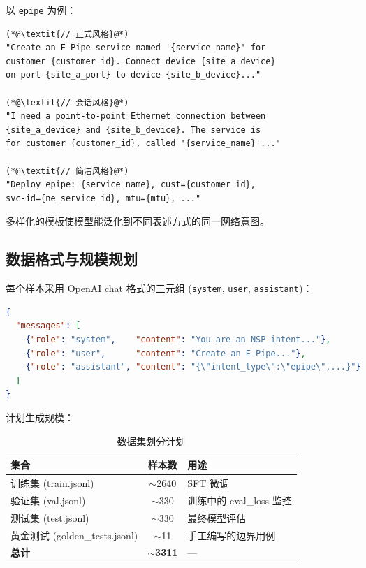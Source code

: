 \documentclass[12pt, a4paper]{article}
\newcommand{\intenttype}[1]{\texttt{#1}}
\begin{document}
\noindent
以 \intenttype{epipe} 为例：

\begin{lstlisting}[language={}, caption={epipe 指令模板示例（三种风格）}, numbers=none]
(*@\textit{// 正式风格}@*)
"Create an E-Pipe service named '{service_name}' for
customer {customer_id}. Connect device {site_a_device}
on port {site_a_port} to device {site_b_device}..."

(*@\textit{// 会话风格}@*)
"I need a point-to-point Ethernet connection between
{site_a_device} and {site_b_device}. The service is
for customer {customer_id}, called '{service_name}'..."

(*@\textit{// 简洁风格}@*)
"Deploy epipe: {service_name}, cust={customer_id},
svc-id={ne_service_id}, mtu={mtu}, ..."
\end{lstlisting}

\noindent
多样化的模板使模型能泛化到不同表述方式的同一网络意图。

\subsection{数据格式与规模规划}

每个样本采用 OpenAI chat 格式的三元组 (\texttt{system}, \texttt{user}, \texttt{assistant})：

\begin{lstlisting}[language=json, caption={训练样本格式示例}]
{
  "messages": [
    {"role": "system",    "content": "You are an NSP intent..."},
    {"role": "user",      "content": "Create an E-Pipe..."},
    {"role": "assistant", "content": "{\"intent_type\":\"epipe\",...}"}
  ]
}
\end{lstlisting}

\noindent
计划生成规模：

\begin{table}[H]
\centering
\caption{数据集划分计划}
\label{tab:data-split}
\small
\begin{tabular}{lcl}
\toprule
\textbf{集合} & \textbf{样本数} & \textbf{用途} \\
\midrule
训练集 (train.jsonl) & $\sim$2640 & SFT 微调 \\
验证集 (val.jsonl)   & $\sim$330  & 训练中的 eval\_loss 监控 \\
测试集 (test.jsonl)  & $\sim$330  & 最终模型评估 \\
黄金测试 (golden\_tests.jsonl) & $\sim$11 & 手工编写的边界用例 \\
\midrule
\textbf{总计} & $\sim$\textbf{3311} & --- \\
\bottomrule
\end{tabular}
\end{table}
\end{document}
